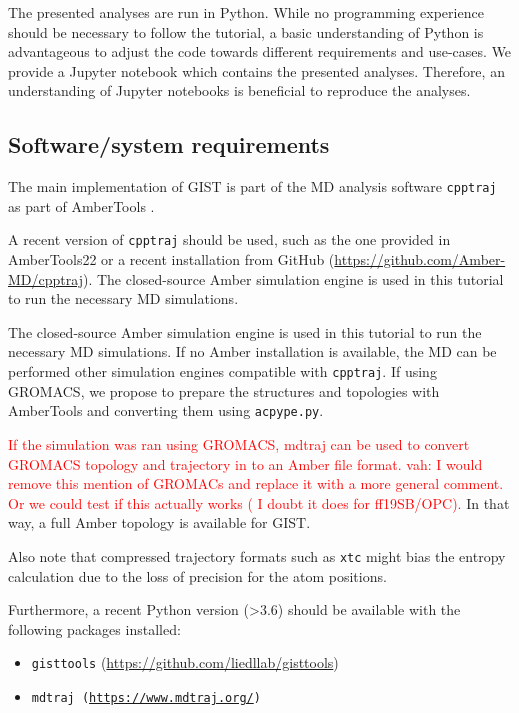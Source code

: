 \documentclass[9pt,tutorial]{livecoms}
\newcommand{\software}{\texttt}
\newcommand{\todo}{\textcolor{red}}
\newcommand\inlinecode{\texttt}
\begin{document}
The presented analyses are run in Python.
While no programming experience should be necessary to follow the tutorial, a basic understanding of Python is advantageous to adjust the code towards different requirements and use-cases. 
We provide a Jupyter notebook which contains the presented analyses. 
Therefore, an understanding of Jupyter notebooks is beneficial to reproduce the analyses.

\subsection{Software/system requirements}
The main implementation of GIST is part of the MD analysis software \software{cpptraj} as part of AmberTools \cite{amber22}.

A recent version of \software{cpptraj} should be used, such as the one provided in AmberTools22 or a recent installation from GitHub (\url{https://github.com/Amber-MD/cpptraj}).
The closed-source Amber simulation engine is used in this tutorial to run the necessary MD simulations. 


The closed-source Amber simulation engine is used in this tutorial to run the necessary MD simulations.
If no Amber installation is available, the MD can be performed other simulation engines compatible with \software{cpptraj}.
If using GROMACS, we propose to prepare the structures and topologies with AmberTools and converting them using \software{acpype.py}.

\todo {If the simulation was ran using GROMACS, mdtraj can be used to convert GROMACS topology and trajectory in to an Amber file format.}
\todo {vah: I would remove this mention of GROMACs and replace it with a more general comment. Or we could test if this actually works ( I doubt it does for ff19SB/OPC).}
In that way, a full Amber topology is available for GIST.

Also note that compressed trajectory formats such as \inlinecode{xtc} might bias the entropy calculation due to the loss of precision for the atom positions.

Furthermore, a recent Python version (>3.6) should be available with the following packages installed:
\begin{itemize}
	\item \software{gisttools} (\url{https://github.com/liedllab/gisttools})
	\item \software{mdtraj (\url{https://www.mdtraj.org/})}
\end{itemize}
\end{document}
